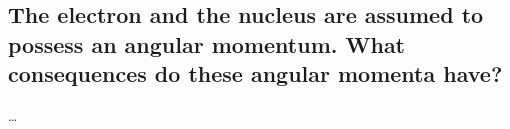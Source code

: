 \subsection{The electron and the nucleus are assumed to possess an angular momentum. What consequences do these angular momenta have?}


\ldots